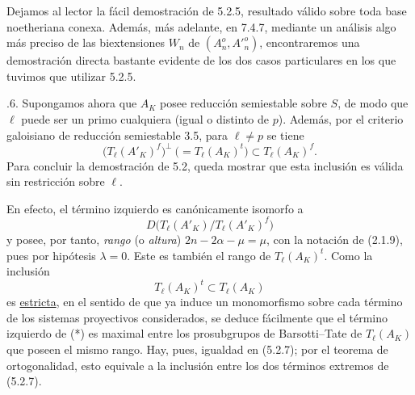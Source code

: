 Dejamos al lector la fácil demostración de 5.2.5, resultado válido sobre
toda base noetheriana conexa. Además, más adelante, en 7.4.7, mediante
un análisis algo más preciso de las biextensiones $W_n$ de
$(A_n^o,{A'}_n^o)$, encontraremos una demostración directa bastante
evidente de los dos casos particulares en los que tuvimos que utilizar
5.2.5.

\smallskip
{}.6. Supongamos ahora que $A_K$ posee reducción semiestable sobre $S$,
de modo que $\ell$ puede ser un primo cualquiera (igual o distinto de
$p$). Además, por el criterio galoisiano de reducción semiestable 3.5,
para $\ell\neq p$ se tiene
\begin{equation}\tag{5.2.7}
 \bigl(T_\ell(A'_K)^f\bigr)^\perp
 \ \bigl(=T_\ell(A_K)^t\bigr)
 \subset T_\ell(A_K)^f.
\end{equation}
Para concluir la demostración de 5.2, queda mostrar que esta inclusión
es válida sin restricción sobre $\ell$.

En efecto, el término izquierdo es canónicamente isomorfo a
\[
 D\bigl(T_\ell(A'_K)/T_\ell(A'_K)^f\bigr)
\]
y posee, por tanto, \emph{rango} (o \emph{altura})
$2n-2\alpha-\mu=\mu$, con la notación de (2.1.9), pues por hipótesis
$\lambda=0$. Este es también el rango de $T_\ell(A_K)^t$. Como la
inclusión
\begin{equation}\tag{*}
 T_\ell(A_K)^t\subset T_\ell(A_K)
\end{equation}
es \underline{estricta}, en el sentido de que ya induce un monomorfismo
sobre cada término de los sistemas proyectivos considerados, se deduce
fácilmente que el término izquierdo de (*) es maximal entre los
prosubgrupos de Barsotti--Tate de $T_\ell(A_K)$ que poseen el
mismo rango. Hay, pues, igualdad en (5.2.7); por el teorema de
ortogonalidad, esto equivale a la inclusión entre los dos términos
extremos de (5.2.7).
